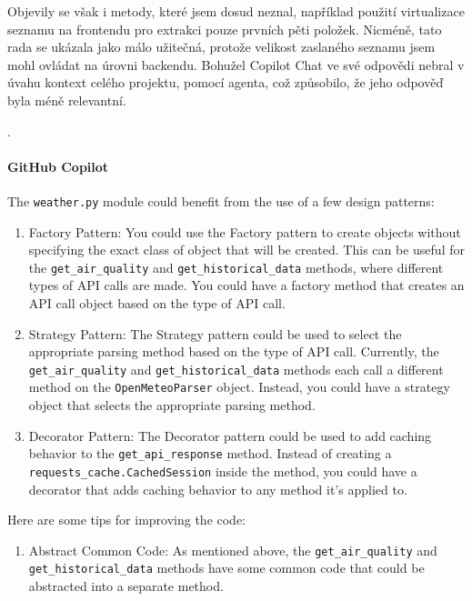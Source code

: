 \documentclass[FM,DP]{tulthesis}
\begin{document}
		
		Objevily se však i metody, které jsem dosud neznal, například použití virtualizace seznamu na frontendu pro extrakci pouze prvních pěti položek. Nicméně, tato rada se ukázala jako málo užitečná, protože velikost zaslaného seznamu jsem mohl ovládat na úrovni backendu. Bohužel Copilot Chat ve své odpovědi nebral v úvahu kontext celého projektu, pomocí agenta, což způsobilo, že jeho odpověď byla méně relevantní.
		
		\cite{enum}.
		\vspace{0.6em}
		\begin{tcolorbox}[colback=white,colframe=black]
			\paragraph{GitHub Copilot}
			
			The \verb|weather.py| module could benefit from the use of a few design patterns:
			
			\begin{enumerate}
				\item Factory Pattern: You could use the Factory pattern to create objects without specifying the exact class of object that will be created. This can be useful for the \verb|get_air_quality| and \verb|get_historical_data| methods, where different types of API calls are made. You could have a factory method that creates an API call object based on the type of API call.
				
				\item Strategy Pattern: The Strategy pattern could be used to select the appropriate parsing method based on the type of API call. Currently, the \verb|get_air_quality| and \verb|get_historical_data| methods each call a different method on the \verb|OpenMeteoParser| object. Instead, you could have a strategy object that selects the appropriate parsing method.
				
				\item Decorator Pattern: The Decorator pattern could be used to add caching behavior to the \verb|get_api_response| method. Instead of creating a \verb|requests_cache.CachedSession| inside the method, you could have a decorator that adds caching behavior to any method it's applied to.
			\end{enumerate}
			
			Here are some tips for improving the code:
			
			\begin{enumerate}
				\item Abstract Common Code: As mentioned above, the \verb|get_air_quality| and \verb|get_historical_data| methods have some common code that could be abstracted into a separate method.
				

\end{enumerate}
\end{tcolorbox}
\end{document}
